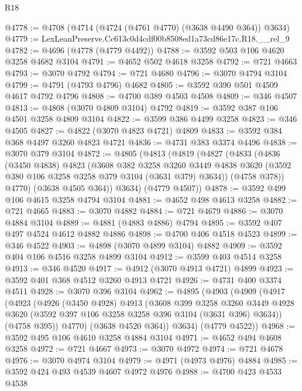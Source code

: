 \begin{lexlean}{R18}
\begin{coremodule}
@4778 := @4708 (@4714 (@4724 (@4761 @4770) (@3638 @4490 @364)) @3634)
@4779 := LexLeanPreserve.Cc613c0d4cdf00b8508ed1a73cd86e17c.R18.__rel_9
@4782 := @4696 (@4778 (@4779 @4492))
@4788 := @3592 @503 @106 @4620 @3258 @4682 @3104
@4791 := @4652 @502 @4618 @3258
@4792 := @721 @4663
@4793 := @3070 @4792
@4794 := @721 @4680
@4796 := @3070 @4794 @3104
@4799 := @4791 (@4793 @4796) @4682
@4805 := @3592 @390 @501 @4509 @4617 @4792 @4796
@4808 := @4700 @389 @4503 @4508
@4809 := @346 @4507
@4813 := @4808 (@3070 @4809 @3104) @4792
@4819 := @3592 @387 @106 @4501 @3258 @4809 @3104
@4822 := @3599 @386 @4499 @3258
@4823 := @346 @4505
@4827 := @4822 (@3070 @4823 @4721) @4809
@4833 := @3592 @384 @368 @4497 @3260 @4823 @4721
@4836 := @4731 @383 @3374 @4496
@4838 := @3070 @379 @3104
@4872 := @4805
    (@4813
      (@4819
        (@4827
          (@4833
            (@4836
              (@3450 @4838)
              @4823
              (@3608
                @382
                @3258
                @3260
                @3449
                @4838
                @3620
                (@3592 @380 @106 @3258 @3258 @379 @3104 (@3631 @379) @3634))
              (@4758 @378))
            @4770)
          (@3638 @4505 @364))
        @3634)
      (@4779 @4507))
@4878 := @3592 @499 @106 @4615 @3258 @4794 @3104
@4881 := @4652 @498 @4613 @3258
@4882 := @721 @4665
@4883 := @3070 @4882
@4884 := @721 @4679
@4886 := @3070 @4884 @3104
@4889 := @4881 (@4883 @4886) @4794
@4895 := @3592 @407 @497 @4524 @4612 @4882 @4886
@4898 := @4700 @406 @4518 @4523
@4899 := @346 @4522
@4903 := @4898 (@3070 @4899 @3104) @4882
@4909 := @3592 @404 @106 @4516 @3258 @4899 @3104
@4912 := @3599 @403 @4514 @3258
@4913 := @346 @4520
@4917 := @4912 (@3070 @4913 @4721) @4899
@4923 := @3592 @401 @368 @4512 @3260 @4913 @4721
@4926 := @4731 @400 @3374 @4511
@4928 := @3070 @396 @3104
@4962 := @4895
    (@4903
      (@4909
        (@4917
          (@4923
            (@4926
              (@3450 @4928)
              @4913
              (@3608
                @399
                @3258
                @3260
                @3449
                @4928
                @3620
                (@3592 @397 @106 @3258 @3258 @396 @3104 (@3631 @396) @3634))
              (@4758 @395))
            @4770)
          (@3638 @4520 @364))
        @3634)
      (@4779 @4522))
@4968 := @3592 @495 @106 @4610 @3258 @4884 @3104
@4971 := @4652 @494 @4608 @3258
@4972 := @721 @4667
@4973 := @3070 @4972
@4974 := @721 @4678
@4976 := @3070 @4974 @3104
@4979 := @4971 (@4973 @4976) @4884
@4985 := @3592 @424 @493 @4539 @4607 @4972 @4976
@4988 := @4700 @423 @4533 @4538

\end{coremodule}
\end{lexlean}
